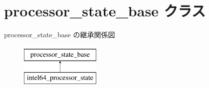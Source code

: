 \hypertarget{classprocessor__state__base}{}\section{processor\+\_\+state\+\_\+base クラス}
\label{classprocessor__state__base}
processor\+\_\+state\+\_\+base の継承関係図\begin{figure}[H]
\begin{center}
\leavevmode
\includegraphics[height=2.000000cm]{classprocessor__state__base}
\end{center}
\end{figure}
